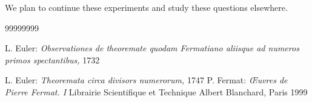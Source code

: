 \documentclass{alggeom}
\begin{document}
We plan to continue these experiments and study these questions elsewhere. 


\begin{thebibliography}{99999999}

 L. Euler: {\it Observationes de theoremate quodam Fermatiano aliisque ad numeros primos spectantibus,} 1732

 L. Euler: {\it Theoremata circa divisors numerorum, } 1747   
  P. Fermat: {\it \OE uvres de {P}ierre {F}ermat. {I}} Librairie Scientifique et Technique Albert Blanchard, Paris 1999
 

 
     
\end{thebibliography}
\end{document}
